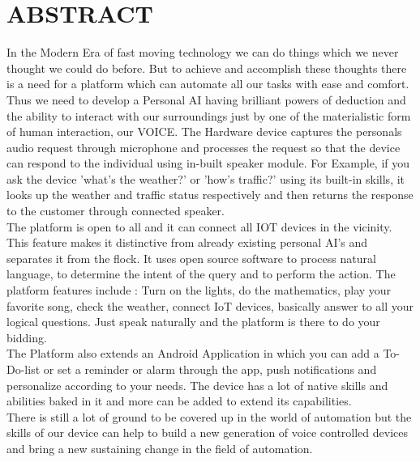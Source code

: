 \chapter*{\Huge\textbf{ABSTRACT}}

\hspace{3em} In the Modern Era of fast moving technology we can do things which we never thought we could do before. But to achieve and accomplish these thoughts there is a need for a platform which can automate all our tasks with ease and comfort.\\

\noindent
Thus we need to develop a Personal AI having brilliant powers of deduction and the ability to interact with our surroundings just by one of the materialistic form of human interaction, our VOICE. The Hardware device captures the personals audio request through microphone and  processes the request so that the device can respond to the individual using in-built speaker module. For Example, if you ask the device 'what's the weather?' or 'how's traffic?' using its built-in skills, it looks up the weather and traffic status respectively and then returns the response to the customer through connected speaker.\\

\noindent
The platform is open to all and it can connect all IOT devices in the vicinity. This feature makes it distinctive from already existing personal AI’s and separates it from the flock. It uses open source software to process natural language, to determine the intent of the query and to perform the action. The platform features include : Turn on the lights, do the mathematics, play your favorite song, check the weather, connect IoT devices, basically answer to all your logical questions. Just speak naturally and the platform is there to do your bidding.\\

\noindent
The Platform also extends an Android Application in which you can add a To-Do-list or set a reminder or alarm through the app, push notifications and personalize according to your needs. The device has a lot of native skills and abilities baked in it and more can be added to extend its capabilities.\\

\noindent
There is still a lot of ground to be covered up in the world of automation but the skills of our device can help to build a new generation of voice controlled devices and bring a new sustaining change in the field of automation.\\
